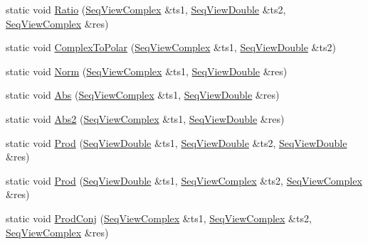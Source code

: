 \begin{Indent}
\begin{DoxyCompactItemize}
\item 
static void \hyperlink{classtsa_1_1_view_util_a0850a008ea672b836c640b7211b074d1}{Ratio} (\hyperlink{namespacetsa_ab32775c889b53c40fa83939f22372b75}{Seq\+View\+Complex} \&ts1, \hyperlink{namespacetsa_ac599574bcc094eda25613724b8f3ca9e}{Seq\+View\+Double} \&ts2, \hyperlink{namespacetsa_ab32775c889b53c40fa83939f22372b75}{Seq\+View\+Complex} \&res)
\item 
static void \hyperlink{classtsa_1_1_view_util_a3ae34d28562d6ff11069e28442ddf4ab}{Complex\+To\+Polar} (\hyperlink{namespacetsa_ab32775c889b53c40fa83939f22372b75}{Seq\+View\+Complex} \&ts1, \hyperlink{namespacetsa_ac599574bcc094eda25613724b8f3ca9e}{Seq\+View\+Double} \&ts2)
\item 
static void \hyperlink{classtsa_1_1_view_util_a2db516bb45aff911805ac0e918235dec}{Norm} (\hyperlink{namespacetsa_ab32775c889b53c40fa83939f22372b75}{Seq\+View\+Complex} \&ts1, \hyperlink{namespacetsa_ac599574bcc094eda25613724b8f3ca9e}{Seq\+View\+Double} \&res)
\item 
static void \hyperlink{classtsa_1_1_view_util_ad297c324daf336cab231821a72770cc6}{Abs} (\hyperlink{namespacetsa_ab32775c889b53c40fa83939f22372b75}{Seq\+View\+Complex} \&ts1, \hyperlink{namespacetsa_ac599574bcc094eda25613724b8f3ca9e}{Seq\+View\+Double} \&res)
\item 
static void \hyperlink{classtsa_1_1_view_util_a287fcc46c379b13cb9e309e4d1113cef}{Abs2} (\hyperlink{namespacetsa_ab32775c889b53c40fa83939f22372b75}{Seq\+View\+Complex} \&ts1, \hyperlink{namespacetsa_ac599574bcc094eda25613724b8f3ca9e}{Seq\+View\+Double} \&res)
\item 
static void \hyperlink{classtsa_1_1_view_util_afd5abb9a4e1b52991858e82299f1dd0a}{Prod} (\hyperlink{namespacetsa_ac599574bcc094eda25613724b8f3ca9e}{Seq\+View\+Double} \&ts1, \hyperlink{namespacetsa_ac599574bcc094eda25613724b8f3ca9e}{Seq\+View\+Double} \&ts2, \hyperlink{namespacetsa_ac599574bcc094eda25613724b8f3ca9e}{Seq\+View\+Double} \&res)
\item 
static void \hyperlink{classtsa_1_1_view_util_a9770830b9f778753ca53d8381e8e3d62}{Prod} (\hyperlink{namespacetsa_ac599574bcc094eda25613724b8f3ca9e}{Seq\+View\+Double} \&ts1, \hyperlink{namespacetsa_ab32775c889b53c40fa83939f22372b75}{Seq\+View\+Complex} \&ts2, \hyperlink{namespacetsa_ab32775c889b53c40fa83939f22372b75}{Seq\+View\+Complex} \&res)
\item 
static void \hyperlink{classtsa_1_1_view_util_aa459fc722f2de53f9c8a5fae665053fa}{Prod\+Conj} (\hyperlink{namespacetsa_ab32775c889b53c40fa83939f22372b75}{Seq\+View\+Complex} \&ts1, \hyperlink{namespacetsa_ab32775c889b53c40fa83939f22372b75}{Seq\+View\+Complex} \&ts2, \hyperlink{namespacetsa_ab32775c889b53c40fa83939f22372b75}{Seq\+View\+Complex} \&res)

\end{DoxyCompactItemize}
\end{Indent}
